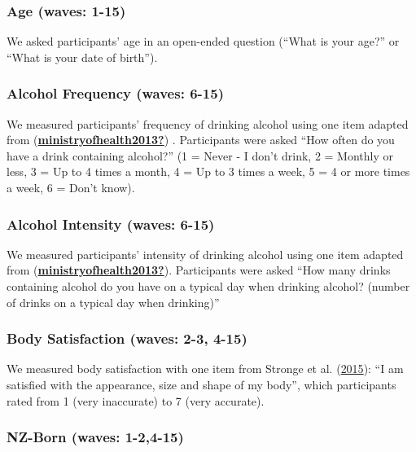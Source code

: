 \documentclass[
  singlecolumn]{report}
\begin{document}
\hypertarget{age-waves-1-15}{%
\subsubsection{Age (waves: 1-15)}\label{age-waves-1-15}}

We asked participants' age in an open-ended question (``What is your
age?'' or ``What is your date of birth'').

\hypertarget{alcohol-frequency-waves-6-15}{%
\subsubsection{Alcohol Frequency (waves:
6-15)}\label{alcohol-frequency-waves-6-15}}

We measured participants' frequency of drinking alcohol using one item
adapted from
(\protect\hyperlink{ref-ministryofhealth2013}{\textbf{ministryofhealth2013?}})
. Participants were asked ``How often do you have a drink containing
alcohol?'' (1 = Never - I don't drink, 2 = Monthly or less, 3 = Up to 4
times a month, 4 = Up to 3 times a week, 5 = 4 or more times a week, 6 =
Don't know).

\hypertarget{alcohol-intensity-waves-6-15}{%
\subsubsection{Alcohol Intensity (waves:
6-15)}\label{alcohol-intensity-waves-6-15}}

We measured participants' intensity of drinking alcohol using one item
adapted from
(\protect\hyperlink{ref-ministryofhealth2013}{\textbf{ministryofhealth2013?}}).
Participants were asked ``How many drinks containing alcohol do you have
on a typical day when drinking alcohol? (number of drinks on a typical
day when drinking)''

\hypertarget{body-satisfaction-waves-2-3-4-15}{%
\subsubsection{Body Satisfaction (waves: 2-3,
4-15)}\label{body-satisfaction-waves-2-3-4-15}}

We measured body satisfaction with one item from Stronge et al.
(\protect\hyperlink{ref-stronge_facebook_2015}{2015}): ``I am satisfied
with the appearance, size and shape of my body'', which participants
rated from 1 (very inaccurate) to 7 (very accurate).

\hypertarget{nz-born-waves-1-24-15}{%
\subsubsection{NZ-Born (waves: 1-2,4-15)}\label{nz-born-waves-1-24-15}}
\end{document}
